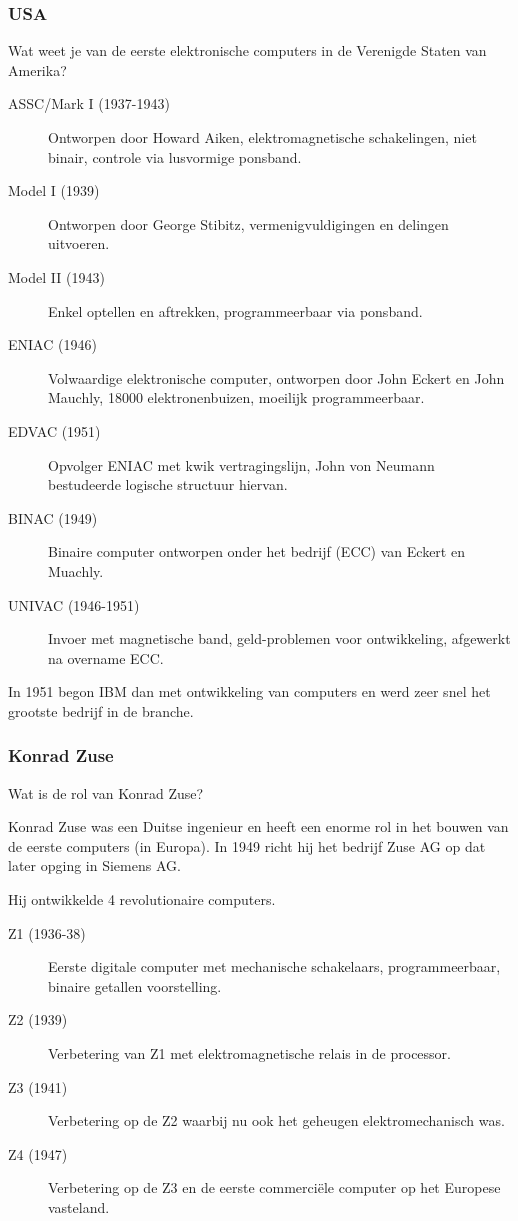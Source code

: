 \documentclass[../main.tex]{subfiles}
\begin{document}
\subsubsection{USA}
\begin{question} Wat weet je van de eerste elektronische computers in de Verenigde Staten van Amerika?  \end{question}
\begin{solution}
		\begin{description}
				\item[ASSC/Mark I (1937-1943)]
						Ontworpen door Howard Aiken, elektromagnetische schakelingen, niet binair, controle via lusvormige ponsband.
				\item[Model I (1939)] Ontworpen door George Stibitz, vermenigvuldigingen en delingen uitvoeren.
				\item[Model II (1943)] Enkel optellen en aftrekken, programmeerbaar via ponsband. 
				\item[ENIAC (1946)] Volwaardige elektronische computer, ontworpen door John Eckert en John Mauchly, 18000 elektronenbuizen, moeilijk programmeerbaar.
				\item[EDVAC (1951)] Opvolger ENIAC met kwik vertragingslijn, John von Neumann bestudeerde logische structuur hiervan.
				\item[BINAC (1949)] Binaire computer ontworpen onder het bedrijf (ECC) van Eckert en Muachly.
				\item[UNIVAC (1946-1951)] Invoer met magnetische band, geld-problemen voor ontwikkeling, afgewerkt na overname ECC.
		\end{description}
		In 1951 begon IBM dan met ontwikkeling van computers en werd zeer snel het grootste bedrijf in de branche.
\end{solution}

\subsubsection{Konrad Zuse}
\begin{question}
Wat is de rol van Konrad Zuse?
\end{question}
\begin{solution}
Konrad Zuse was een Duitse ingenieur en heeft een enorme rol in het bouwen van de eerste computers (in Europa).
In 1949 richt hij het bedrijf Zuse AG op dat later opging in Siemens AG.

Hij ontwikkelde 4 revolutionaire computers.
\begin{description}
		\item[Z1 (1936-38)] Eerste digitale computer met mechanische schakelaars, programmeerbaar, binaire getallen voorstelling.
		\item[Z2 (1939)] Verbetering van Z1 met elektromagnetische relais in de processor.
		\item[Z3 (1941)] Verbetering op de Z2 waarbij nu ook het geheugen elektromechanisch was.
		\item[Z4 (1947)] Verbetering op de Z3 en de eerste commerci\"ele computer op het Europese vasteland.
\end{description}
\end{solution}
\end{document}

